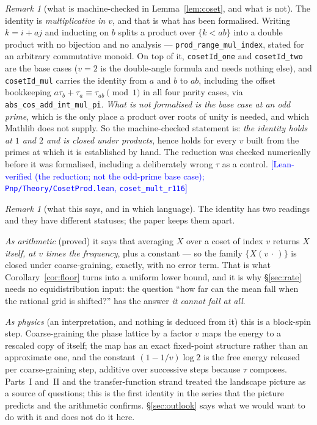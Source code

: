 \documentclass[11pt,a4paper]{article}
\theoremstyle{plain}
\theoremstyle{definition}
\theoremstyle{remark}
\newtheorem{remark}[theorem]{Remark}
\newcommand{\Lean}[1]{\texttt{#1}}
\newcommand{\STATUS}[1]{\textcolor{blue}{\textsf{[#1]}}}
\begin{document}
\begin{remark}[what is machine-checked in Lemma~\ref{lem:coset}, and what is not]\label{rem:leancoset}
The identity is \emph{multiplicative in $v$}, and that is what has been formalised. Writing
$k=i+aj$ and inducting on $b$ splits a product over $\{k<ab\}$ into a double product with no
bijection and no analysis --- \Lean{prod\_range\_mul\_index}, stated for an arbitrary commutative
monoid. On top of it, \Lean{cosetId\_one} and \Lean{cosetId\_two} are the base cases ($v=2$ is
the double-angle formula and needs nothing else), and \Lean{cosetId\_mul} carries the identity
from $a$ and $b$ to $ab$, including the offset bookkeeping
$a\tau_b+\tau_a\equiv\tau_{ab}\pmod 1$ in all four parity cases, via
\Lean{abs\_cos\_add\_int\_mul\_pi}.
\emph{What is not formalised is the base case at an odd prime}, which is the only place a
product over roots of unity is needed, and which Mathlib does not supply. So the machine-checked
statement is: \emph{the identity holds at $1$ and $2$ and is closed under products}, hence holds
for every $v$ built from the primes at which it is established by hand. The reduction was
checked numerically before it was formalised, including a deliberately wrong $\tau$ as a
control.
\STATUS{Lean-verified (the reduction; not the odd-prime base case);
\texttt{Pnp/Theory/CosetProd.lean}, \texttt{coset\_mult\_r116}}
\end{remark}

\begin{remark}[what this says, and in which language]\label{rem:renorm}
The identity has two readings and they have different statuses; the paper keeps them apart.

\emph{As arithmetic} (proved) it says that averaging $X$ over a coset of index $v$ returns
\emph{$X$ itself, at $v$ times the frequency}, plus a constant --- so the family
$\{X(v\,\cdot\,)\}$ is closed under coarse-graining, exactly, with no error term. That is what
Corollary~\ref{cor:floor} turns into a uniform lower bound, and it is why \S\ref{sec:rate} needs
no equidistribution input: the question ``how far can the mean fall when the rational grid is
shifted?'' has the answer \emph{it cannot fall at all}.

\emph{As physics} (an interpretation, and nothing is deduced from it) this is a block-spin step.
Coarse-graining the phase lattice by a factor $v$ maps the energy to a rescaled copy of itself;
the map has an exact fixed-point structure rather than an approximate one, and the constant
$(1-1/v)\log2$ is the free energy released per coarse-graining step, additive over successive
steps because $\tau$ composes. Parts~I and~II and the transfer-function strand treated the landscape picture as a source of
questions; this is the first identity in the series that the picture predicts and the arithmetic
confirms. \S\ref{sec:outlook} says what we would want to do with it and does not do it here.
\end{remark}
\end{document}
